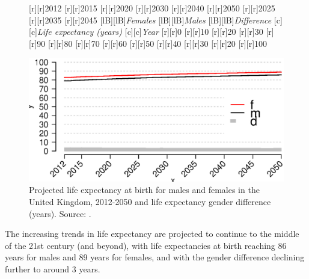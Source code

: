 \documentclass[11 pt, a4paper]{report}
\begin{document}
\begin{figure}[hbtp!]
[r][r]{\small{2012}}
[r][r]{\small{2015}}
[r][r]{\small{2020}}
[r][r]{\small{2030}}
[r][r]{\small{2040}}
[r][r]{\small{2050}}
[r][r]{\small{2025}}
[r][r]{\small{2035}}
[r][r]{\small{2045}}
[lB][lB]{\small{\emph{Females}}}
[lB][lB]{\small{\emph{Males}}}
[lB][lB]{\small{\emph{Difference}}}
[c][c]{\small{\emph{Life expectancy (years)}}}
[c][c]{\small{\emph{Year}}}
[r][r]{\small{0}}
[r][r]{\small{10}}
[r][r]{\small{20}}
[r][r]{\small{30}}
[r][r]{\small{90}}
[r][r]{\small{80}}
[r][r]{\small{70}}
[r][r]{\small{60}}
[r][r]{\small{50}}
[r][r]{\small{40}}
[r][r]{\small{30}}
[r][r]{\small{20}}
[r][r]{\small{100}}

\includegraphics[width=\textwidth]{../figures/Fig2.4.eps}
\caption{Projected life expectancy at birth for males and females in the United Kingdom, 2012-2050 and life expectancy gender difference (years). Source: \citet{ONS2013c}.}
\label{Fig:10}
\end{figure}

The increasing trends in life expectancy are projected to continue to the middle of the 21st century (and beyond), with life expectancies at birth reaching 86 years for males and 89 years for females, and with the gender difference declining further to around 3 years. 
\end{document}
